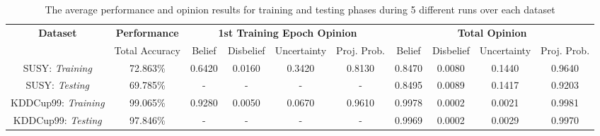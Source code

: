 \begin{table}[!ht]
\centering
\caption{The average performance and opinion results for training and testing phases during 5 different runs over each dataset}
\vspace{-0.1cm}
\begin{tabular}{c c cccc cccc}
    \toprule
\multirow{2}{*}{\textbf{Dataset}} 
        & \multicolumn{1}{c}{\textbf{Performance}} & \multicolumn{4}{c}{\textbf{1st Training Epoch Opinion}} &
        \multicolumn{4}{c}{\textbf{Total Opinion}} \\
    \cmidrule(lr){2-2} \cmidrule(lr){3-6} \cmidrule(lr){7-10}
        & Total Accuracy & Belief & Disbelief & Uncertainty & Proj. Prob. & Belief  & Disbelief & Uncertainty & Proj. Prob. \\
    \midrule
SUSY: \textit{Training} 
        & 72.863\%  & 0.6420 & 0.0160 & 0.3420 & 0.8130 & 0.8470 & 0.0080 & 0.1440 & 0.9640      \\
    \addlinespace
SUSY: \textit{Testing}
        & 69.785\%   & - & - & - & - &  0.8495 & 0.0089 & 0.1417 & 0.9203        \\
    \addlinespace
KDDCup99: \textit{Training}
        & 99.065\%  & 0.9280 & 0.0050 & 0.0670 & 0.9610 & 0.9978 & 0.0002 & 0.0021 & 0.9981 \\
    \addlinespace
KDDCup99: \textit{Testing}
        & 97.846\%   &  -   &  -  &  -  & - &  0.9969 & 0.0002 & 0.0029 & 0.9970    \\

    \bottomrule
\end{tabular}
\label{result}
\end{table}


